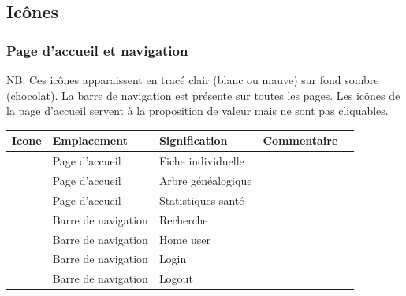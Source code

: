 ﻿\documentclass[a4paper,10pt]{article}
\begin{document}
\subsection{Icônes}
\label{ssec:icons}

\subsubsection{Page d'accueil et navigation}
NB. Ces icônes apparaissent en tracé clair (blanc ou mauve) sur fond sombre (chocolat). La barre de navigation est présente sur toutes les pages. Les icônes de la page d'accueil servent à la proposition de valeur mais ne sont pas cliquables. 

\renewcommand{\arraystretch}{1.5}
\begin{longtable}{|c|l|l|l|l|}\hline
\textbf{Icone} & \textbf{Emplacement} & \textbf{Signification} & \textbf{Commentaire}\\\hline
\endhead
 & Page d'accueil & Fiche individuelle &  \\\hline
 & Page d'accueil & Arbre généalogique &  \\\hline
 & Page d'accueil & Statistiques santé &  \\\hline\hline

 & Barre de navigation & Recherche &  \\\hline
 & Barre de navigation & Home user &  \\\hline
 & Barre de navigation & Login &  \\\hline
 & Barre de navigation & Logout &  \\\hline

\end{longtable}
\end{document}
